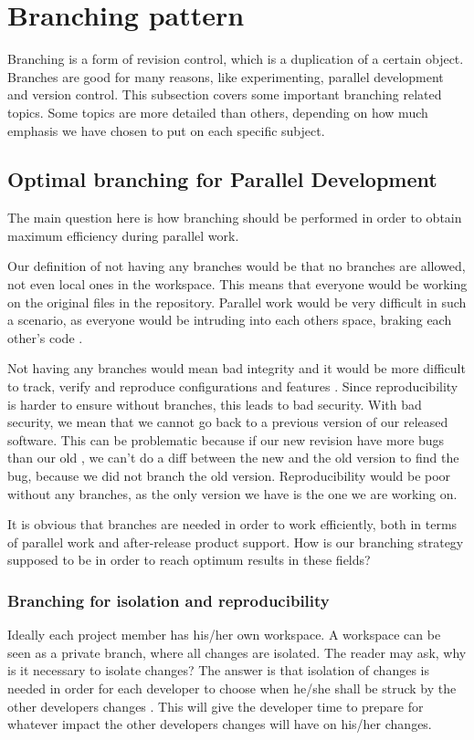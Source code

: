 \documentclass[10pt]{article}
\begin{document}
\section{Branching pattern}
Branching is a form of revision control, which is a duplication of a certain object. Branches are good for many reasons, like experimenting, parallel development and version control. This subsection covers some important branching related topics. Some topics are more detailed than others, depending on how much emphasis we have chosen to put on each specific subject.
\subsection{Optimal branching for Parallel Development}
The main question here is how branching should be performed in order to obtain maximum efficiency during parallel work.

\noindent Our definition of not having any branches would be that no branches are allowed, not even local ones in the workspace. This means that everyone would be working on the original files in the repository. Parallel work would be very difficult in such a scenario, as everyone would be intruding into each others space, braking each other's code \cite{Appleton}.

\noindent Not having any branches would mean bad integrity and it would be more difficult to track, verify and reproduce configurations and features \cite{Appleton}. Since reproducibility is harder to ensure without branches, this leads to bad security. With bad security, we mean that we cannot go back to a previous version of our released software. This can be problematic because if our new revision have more bugs than our old \cite{Babich}, we can't do a diff between the new and the old version to find the bug, because we did not branch the old version. Reproducibility would be poor without any branches, as the only version we have is the one we are working on.

\noindent It is obvious that branches are needed in order to work efficiently, both in terms of parallel work and after-release product support. How is our branching strategy supposed to be in order to reach optimum results in these fields?

\subsubsection{Branching for isolation and reproducibility}
\noindent Ideally each project member has his/her own workspace. A workspace can be seen as a private branch, where all changes are isolated. The reader may ask, why is it necessary to isolate changes? The answer is that isolation of changes is needed in order for each developer to choose when he/she shall be struck by the other developers changes \cite{Appleton}. This will give the developer time to prepare for whatever impact the other developers changes will have on his/her changes.
\end{document}
